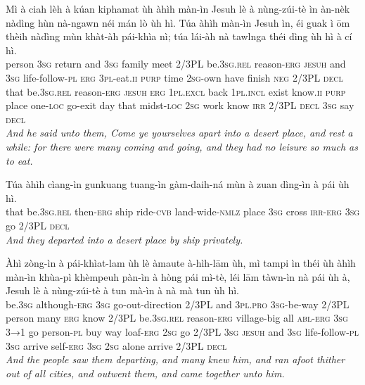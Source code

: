 \documentclass[11pt,a4paper]{article}
\begin{document}
\begin{exe}
\gll Mì à ciah lèh à kúan kiphamat ùh àhìh màn-ìn Jesuh lè à nùng-zúi-tè ìn àn-nèk nàdìng hùn nà-ngawn néi mán lò ùh hì. Túa àhìh màn-ìn Jesuh ìn, éi guak ì ōm thèih nàdìng mùn khàt-àh pái-khìa nì; túa lái-àh nà tawlnga théi dìng ùh hì à cí hì. \\
     person \textsc{3sg} return and \textsc{3sg} family meet 2/3PL be.\textsc{3sg}.\textsc{rel} reason-\textsc{erg} \textsc{jesuh} and \textsc{3sg} life-follow-\textsc{pl} \textsc{erg} \textsc{3pl}-eat.\textsc{ii} \textsc{purp} time \textsc{2sg}-own have finish \textsc{neg} 2/3PL \textsc{decl} that be.\textsc{3sg}.\textsc{rel} reason-\textsc{erg} \textsc{jesuh} \textsc{erg} \textsc{1pl}.\textsc{excl} back \textsc{1pl}.\textsc{incl} exist know.\textsc{ii} \textsc{purp} place one-\textsc{loc} go-exit day that midst-\textsc{loc} \textsc{2sg} work know \textsc{irr} 2/3PL \textsc{decl} \textsc{3sg} say \textsc{decl} \\
\glt \textcolor{kjvcolor}{\textit{And he said unto them, Come ye yourselves apart into a desert place, and rest a while: for there were many coming and going, and they had no leisure so much as to eat.}}

\gll Túa àhìh cìang-ìn gunkuang tuang-ìn gàm-daih-ná mùn à zuan dìng-ìn à pái ùh hì. \\
     that be.\textsc{3sg}.\textsc{rel} then-\textsc{erg} ship ride-\textsc{cvb} land-wide-\textsc{nmlz} place \textsc{3sg} cross \textsc{irr}-\textsc{erg} \textsc{3sg} go 2/3PL \textsc{decl} \\
\glt \textcolor{kjvcolor}{\textit{And they departed into a desert place by ship privately.}}

\gll Àhì zòng-ìn à pái-khìat-lam ùh lè àmaute à-hìh-lām ùh, mì tampi ìn théi ùh àhìh màn-ìn khùa-pì khèmpeuh pàn-ìn à hòng pái mì-tè, léi lām tàwn-ìn nà pái ùh à, Jesuh lè à nùng-zúi-tè à tun mà-ìn à nà mà tun ùh hì. \\
     be.\textsc{3sg} although-\textsc{erg} \textsc{3sg} go-out-direction 2/3PL and \textsc{3pl}.\textsc{pro} \textsc{3sg}-be-way 2/3PL person many \textsc{erg} know 2/3PL be.\textsc{3sg}.\textsc{rel} reason-\textsc{erg} village-big all \textsc{abl}-\textsc{erg} \textsc{3sg} \textsc{3→1} go person-\textsc{pl} buy way loaf-\textsc{erg} \textsc{2sg} go 2/3PL \textsc{3sg} \textsc{jesuh} and \textsc{3sg} life-follow-\textsc{pl} \textsc{3sg} arrive self-\textsc{erg} \textsc{3sg} \textsc{2sg} alone arrive 2/3PL \textsc{decl} \\
\glt \textcolor{kjvcolor}{\textit{And the people saw them departing, and many knew him, and ran afoot thither out of all cities, and outwent them, and came together unto him.}}


\end{exe}
\end{document}
